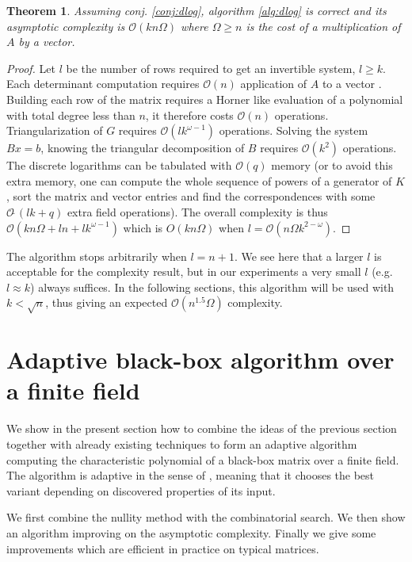 \documentclass{article}
\newtheorem{thm}{Theorem}[section]
\newcommand{\GO}{\mathcal{ O}}
\newcommand{\sO}{\mathcal{ O}\tilde\ }
\begin{document}
\begin{thm}Assuming conj. \ref{conj:dlog},
algorithm \ref{alg:dlog} is correct and its asymptotic complexity is 
$\GO( k n \Omega )$ where $\Omega\geq n$ is the cost of a multiplication of
$A$ by a vector.
\end{thm}
\begin{proof} Let $l$ be the
  number of rows required to get an invertible system, $l \geq k$.
Each determinant computation requires $\GO(n)$ application of $A$ to a vector
\cite[\S 3.1]{Turner:2002:these}. Building each row of the matrix requires a
Horner like evaluation of a polynomial with total degree less than $n$,
it therefore costs $\GO( n )$ operations. Triangularization of $G$
requires $\GO{(l k^{\omega-1})}$ operations. Solving the system $Bx=b$, knowing
the triangular decomposition of $B$ requires $\GO( k^2 )$
operations. The discrete logarithms can be tabulated
\cite{jgd:2004:dotprod} with $\GO(q)$ memory
(or to avoid this extra memory, one can compute the whole
sequence of powers of a generator of $K$, sort the matrix and vector
entries and find the correspondences with some $\sO(lk+q)$
extra field operations). 
The overall complexity is thus 
$\GO( k n \Omega + ln + lk^{\omega-1})$ which is $O(k n \Omega)$ 
when $l =\GO(n\Omega k^{2-\omega})$. \end{proof}
The algorithm stops arbitrarily when $l = n + 1$.  We see here that a larger $l$
is acceptable for the complexity result, but in our experiments a very small $l$
(e.g. $l \approx k$) always suffices. 
In the following sections, this algorithm will be used with
$k<\sqrt{n}$, thus giving an expected $\GO(n^{1.5}\Omega)$ complexity.


\section{Adaptive black-box algorithm over a finite field}\label{sec:adap}

We show in the present section how to combine the ideas of the
previous section together with already existing techniques to form an adaptive
algorithm computing the characteristic polynomial of a black-box matrix
over a finite field. The algorithm is adaptive in the sense of
\cite{jgd:2006:AHA}, meaning that it chooses the best variant depending
on discovered properties of its input.

We first combine the nullity method with the combinatorial search.
We then show  an algorithm improving on the asymptotic
complexity. Finally we give some improvements which are efficient in practice 
on typical matrices.
\end{document}
